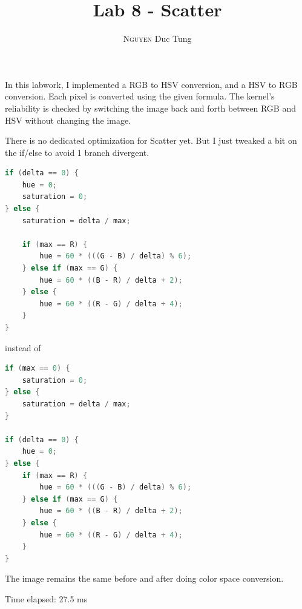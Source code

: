\documentclass[12pt]{article}
\title{\vspace{-1.5cm}Lab 8 - Scatter}
\author{\textsc{Nguyen} Duc Tung}
\date{}
\begin{document}
\maketitle

In this labwork, I implemented a RGB to HSV conversion, and a HSV to RGB conversion. Each pixel is converted using the given formula. The kernel's reliability is checked by switching the image back and forth between RGB and HSV without changing the image.

There is no dedicated optimization for Scatter yet. But I just tweaked a bit on the if/else to avoid 1 branch divergent.

\begin{lstlisting}[language=C]
if (delta == 0) {
    hue = 0;
    saturation = 0;
} else {
    saturation = delta / max;

    if (max == R) {
        hue = 60 * (((G - B) / delta) % 6);
    } else if (max == G) {
        hue = 60 * ((B - R) / delta + 2);
    } else {
        hue = 60 * ((R - G) / delta + 4);
    }
}
\end{lstlisting}

instead of

\begin{lstlisting}[language=C]
if (max == 0) {
    saturation = 0;
} else {
    saturation = delta / max;
}

if (delta == 0) {
    hue = 0;
} else {
    if (max == R) {
        hue = 60 * (((G - B) / delta) % 6);
    } else if (max == G) {
        hue = 60 * ((B - R) / delta + 2);
    } else {
        hue = 60 * ((R - G) / delta + 4);
    }
}
\end{lstlisting}

The image remains the same before and after doing color space conversion.

Time elapsed: 27.5 ms
\end{document}
